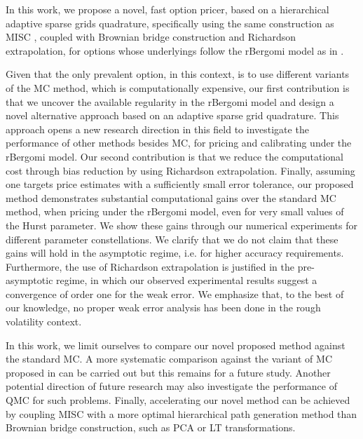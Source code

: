 In this work,  we propose a novel, fast option pricer,  based on a  hierarchical adaptive sparse grids quadrature, specifically using the same construction as MISC \cite{haji2016multi}, coupled with Brownian bridge construction and Richardson extrapolation, for options whose underlyings  follow the rBergomi model as in \cite{bayer2016pricing}. 

Given that the only prevalent option, in this context, is to use different variants of the MC method, which is computationally expensive, our first contribution  is that we uncover the available regularity in the rBergomi model and  design a novel alternative approach based on an  adaptive sparse grid quadrature. This approach  opens a new research direction in this field to investigate the performance of other methods besides MC, for pricing and calibrating under the rBergomi model. Our second contribution is that we reduce the computational cost  through bias reduction by using Richardson extrapolation. Finally, assuming one targets price estimates with a sufficiently small error tolerance, our proposed method demonstrates substantial computational gains  over the standard MC method, when pricing under the rBergomi model, even for very small values of the Hurst parameter. We show  these gains through our numerical experiments for  different parameter constellations.  We clarify that we do not claim that these gains will hold in the asymptotic regime, i.e.  for higher accuracy requirements. Furthermore, the use of Richardson extrapolation is justified in the pre-asymptotic regime, in which our observed experimental results suggest a convergence of order one for the weak error. We emphasize that, to the best of our knowledge, no proper weak error analysis has been done in the rough volatility context. 

In this work, we limit ourselves to compare our novel proposed method against the standard MC. A more systematic comparison against the variant of MC proposed in \cite{mccrickerd2018turbocharging}  can be carried out but this remains for a future study. Another  potential direction of future  research may also investigate the performance of QMC for such problems. Finally, accelerating  our novel  method can be achieved  by coupling MISC with a more optimal hierarchical path generation method than Brownian bridge construction, such as PCA or LT transformations.